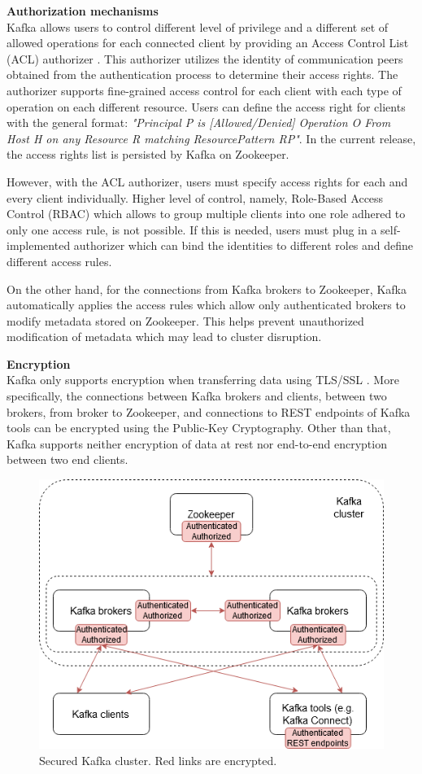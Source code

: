 \textbf{Authorization mechanisms}\\
Kafka allows users to control different level of privilege and a different set of allowed operations for each connected client by providing an Access Control List (ACL) authorizer \cite{kafkasecurity}. This authorizer utilizes the identity of communication peers obtained from the authentication process to determine their access rights. The authorizer supports fine-grained access control for each client with each type of operation on each different resource. Users can define the access right for clients with the general format: \emph{"Principal P is [Allowed/Denied] Operation O From Host H on any Resource R matching ResourcePattern RP"}. In the current release, the access rights list is persisted by Kafka on Zookeeper. 

However, with the ACL authorizer, users must specify access rights for each and every client individually. Higher level of control, namely, Role-Based Access Control (RBAC) which allows to group multiple clients into one role adhered to only one access rule, is not possible. If this is needed, users must plug in a self-implemented authorizer which can bind the identities to different roles and define different access rules. 

On the other hand, for the connections from Kafka brokers to Zookeeper, Kafka automatically applies the access rules which allow only authenticated brokers to modify metadata stored on Zookeeper. This helps prevent unauthorized modification of metadata which may lead to cluster disruption.

\textbf{Encryption}\\
Kafka only supports encryption when transferring data using TLS/SSL \cite{kafkasecurity}. More specifically, the connections between Kafka brokers and clients, between two brokers, from broker to Zookeeper, and connections to REST endpoints of Kafka tools can be encrypted using the Public-Key Cryptography. Other than that, Kafka supports neither encryption of data at rest nor end-to-end encryption between two end clients.  

\begin{figure}[h]
	\centering
	\includegraphics[width=11.5cm]{images/security-kafka.png}
	\caption{Secured Kafka cluster. Red links are encrypted.}
	\label{fig:securitykafka}
\end{figure}

